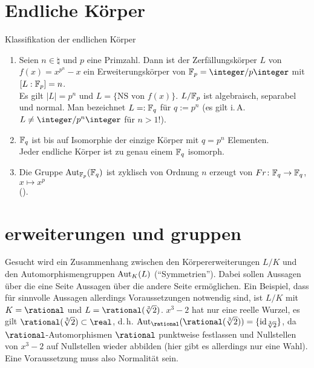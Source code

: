 \section{%
    Endliche Körper%
}

\begin{Theorem}{Klassifikation der endlichen Körper}
    \begin{enumerate}[label=(\alph*)]
        \item
        Seien $n \in \natural$ und $p$ eine Primzahl.
        Dann ist der Zerfällungskörper $L$ von $f(x) = x^{p^n} - x$
        ein Erweiterungskörper von $\F_p = \integer/p\integer$ mit
        $[L:\mathbb{F}_p] = n$.\\
        Es gilt $|L| = p^n$ und $L = \{\text{NS von } f(x)\}$.
        $L/\mathbb{F}_p$ ist algebraisch, separabel und normal.
        Man bezeichnet $L =: \mathbb{F}_q$ für $q := p^n$
        (es gilt i.\,A. $L \not= \integer/p^n\integer$ für $n > 1$!).

        \item
        $\mathbb{F}_q$ ist bis auf Isomorphie der einzige Körper mit $q = p^n$
        Elementen.\\
        Jeder endliche Körper ist zu genau einem $\mathbb{F}_q$ isomorph.

        \item
        Die Gruppe $\operatorname{Aut}_{\mathbb{F}_p}(\mathbb{F}_q)$ ist zyklisch von Ordnung $n$
        erzeugt von $Fr\colon \mathbb{F}_q \rightarrow \mathbb{F}_q$, $x \mapsto x^p$\\
        ().
    \end{enumerate}
\end{Theorem}

\section{%
    erweiterungen und gruppen%
}

\begin{Bem}
    Gesucht wird ein Zusammenhang zwischen den Körpererweiterungen $L/K$
    und den Automorphismengruppen $\operatorname{Aut}_K(L)$ ("`Symmetrien"').
    Dabei sollen Aussagen über die eine Seite Aussagen über die andere
    Seite ermöglichen.
    Ein Beispiel, dass für sinnvolle Aussagen allerdings Voraussetzungen
    notwendig sind,
    ist $L/K$ mit $K = \rational$ und $L = \rational(\sqrt[3]{2})$.
    $x^3 - 2$ hat nur eine reelle Wurzel, es gilt
    $\rational(\sqrt[3]{2}) \subset \real$, d.\,h.
    $\Aut_\rational(\rational(\sqrt[3]{2})) = \{\id_{\sqrt[3]{2}}\}$,
    da $\rational$-Automorphismen $\rational$ punktweise festlassen und
    Nullstellen von $x^3 - 2$ auf Nullstellen wieder abbilden
    (hier gibt es allerdings nur eine Wahl).
    Eine Voraussetzung muss also Normalität sein.
\end{Bem}

